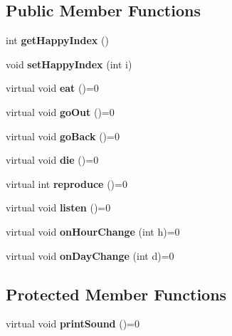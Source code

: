 \subsection*{Public Member Functions}
\begin{DoxyCompactItemize}
\item 
\mbox{\label{class_emotion_animal_ae075ddea4c14459fc47dd8fb6b986676}} 
int {\bfseries get\+Happy\+Index} ()
\item 
\mbox{\label{class_emotion_animal_af269fd4dc612625c77ce55667502a092}} 
void {\bfseries set\+Happy\+Index} (int i)
\item 
\mbox{\label{class_emotion_animal_ad112df6f803ac02b701558c4765c8dc9}} 
virtual void {\bfseries eat} ()=0
\item 
\mbox{\label{class_emotion_animal_a4961194875c3c286808f2aa2a23eec3d}} 
virtual void {\bfseries go\+Out} ()=0
\item 
\mbox{\label{class_emotion_animal_aee6f0e1c1bf618172d59a79fe1630190}} 
virtual void {\bfseries go\+Back} ()=0
\item 
\mbox{\label{class_emotion_animal_ad89a20ca48b79c9fc5681d6b5a811330}} 
virtual void {\bfseries die} ()=0
\item 
\mbox{\label{class_emotion_animal_a499ff4778d256bac4cc3604ff764e371}} 
virtual int {\bfseries reproduce} ()=0
\item 
\mbox{\label{class_emotion_animal_a9740606110f30a35c2a64fda0200ea6f}} 
virtual void {\bfseries listen} ()=0
\item 
\mbox{\label{class_emotion_animal_a28e538a0afde42d04fc68c3da53bffbf}} 
virtual void {\bfseries on\+Hour\+Change} (int h)=0
\item 
\mbox{\label{class_emotion_animal_a4c065f7aa86b04e35a5caf5c5753ae42}} 
virtual void {\bfseries on\+Day\+Change} (int d)=0
\end{DoxyCompactItemize}
\subsection*{Protected Member Functions}
\begin{DoxyCompactItemize}
\item 
\mbox{\label{class_emotion_animal_acfa023a678c278d8da78adac0bc3234f}} 
virtual void {\bfseries print\+Sound} ()=0
\end{DoxyCompactItemize}
